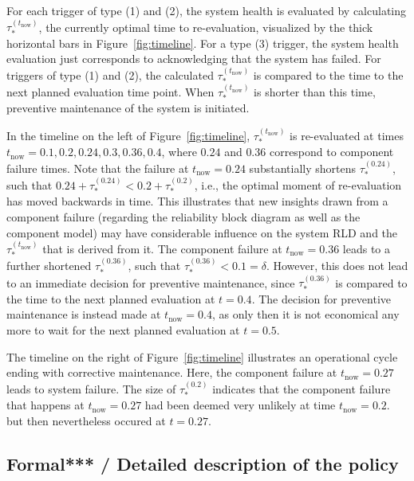 \documentclass[authoryear]{elsarticle}
\def\tnow{t_\text{now}}
\newcommand{\tausnow}{\tau_*^{(\tnow)}}
\newcommand{\tausfun}[1]{\tau_*^{(#1)}}
\begin{document}
For each trigger of type (1) and (2),
the system health is evaluated by calculating $\tausnow$,
the currently optimal time to re-evaluation, %
visualized by the thick horizontal bars in Figure~\ref{fig:timeline}.
For a type (3) trigger, the system health evaluation just corresponds to acknowledging that the system has failed.
For triggers of type (1) and (2),
the calculated $\tausnow$ is compared to the time to the next planned evaluation time point.
When $\tausnow$ is shorter than this time,
preventive maintenance of the system is initiated.

In the timeline on the left of Figure~\ref{fig:timeline},
$\tausnow$ is re-evaluated at times $\tnow = 0.1, 0.2, 0.24, 0.3, 0.36, 0.4$,
where $0.24$ and $0.36$ correspond to component failure times.
Note that the failure at $\tnow = 0.24$ substantially shortens $\tausfun{0.24}$,
such that $0.24 + \tausfun{0.24} < 0.2 + \tausfun{0.2}$,
i.e., the optimal moment of re-evaluation has moved backwards in time.
This illustrates that new insights drawn from a component failure
(regarding the reliability block diagram as well as the component model)
may have considerable influence on the system RLD
and the $\tausnow$ that is derived from it.
The component failure at $\tnow = 0.36$ leads to a further shortened $\tausfun{0.36}$,
such that $\tausfun{0.36} < 0.1 = \delta$.
However, this does not lead to an immediate decision for preventive maintenance,
since $\tausfun{0.36}$ is compared to the time to the next planned evaluation at $t = 0.4$.
The decision for preventive maintenance is instead made at $\tnow = 0.4$,
as only then it is not economical any more to wait for the next planned evaluation at $t = 0.5$.

The timeline on the right of Figure~\ref{fig:timeline} illustrates an operational cycle ending with corrective maintenance.
Here, the component failure at $\tnow = 0.27$ leads to system failure.
The size of $\tausfun{0.2}$ indicates that the component failure that happens at $\tnow = 0.27$
had been deemed very unlikely at time $\tnow = 0.2$.
but then nevertheless occured at $t = 0.27$.


\subsection{Formal*** / Detailed description of the policy}
\label{sec:operationalprocedure}
\end{document}
